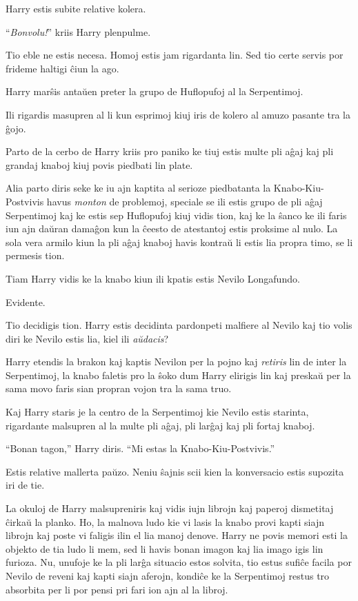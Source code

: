 Harry estis subite relative kolera.

``\emph{Bonvolu!}'' kriis Harry plenpulme.

Tio eble ne estis necesa. Homoj estis jam rigardanta lin. Sed tio
certe servis por frideme haltigi ĉiun la ago.

Harry marŝis antaŭen preter la grupo de Huflopufoj al la Serpentimoj.

Ili rigardis masupren al li kun esprimoj kiuj iris de kolero al amuzo
pasante tra la ĝojo.

Parto de la cerbo de Harry kriis pro paniko ke tiuj estis multe pli
aĝaj kaj pli grandaj knaboj kiuj povis piedbati lin plate.

Alia parto diris seke ke iu ajn kaptita al serioze piedbatanta la
Knabo-Kiu-Postvivis havus \emph{monton} de problemoj, speciale se ili
estis grupo de pli aĝaj Serpentimoj kaj ke estis sep Huflopufoj kiuj
vidis tion, kaj ke la ŝanco ke ili faris iun ajn daŭran damaĝon kun la
ĉeesto de atestantoj estis proksime al nulo. La sola vera armilo kiun
la pli aĝaj knaboj havis kontraŭ li estis lia propra timo, se li
permesis tion. 

Tiam Harry vidis ke la knabo kiun ili kpatis estis Nevilo Longafundo.

Evidente.

Tio decidigis tion. Harry estis decidinta pardonpeti malfiere al
Nevilo kaj tio volis diri ke Nevilo estis lia, kiel ili
\emph{aŭdacis}?

Harry etendis la brakon kaj kaptis Nevilon per la pojno kaj
\emph{retiris} lin de inter la Serpentimoj, la knabo faletis pro la
ŝoko dum Harry elirigis lin kaj preskaŭ per la sama movo faris
sian propran vojon tra la sama truo.

Kaj Harry staris je la centro de la Serpentimoj kie Nevilo estis
starinta, rigardante malsupren al la multe pli aĝaj, pli larĝaj kaj
pli fortaj knaboj.

``Bonan tagon,'' Harry diris. ``Mi estas la Knabo-Kiu-Postvivis.''

Estis relative mallerta paŭzo. Neniu ŝajnis scii kien la
konversacio estis supozita iri de tie.

La okuloj de Harry malsupreniris kaj vidis iujn librojn kaj paperoj
dismetitaj ĉirkaŭ la planko. Ho, la malnova ludo kie vi lasis la knabo
provi kapti siajn librojn kaj poste vi faligis ilin el lia manoj
denove. Harry ne povis memori esti la objekto de tia ludo li mem, sed
li havis bonan imagon kaj lia imago igis lin furioza. Nu, unufoje ke
la pli larĝa situacio estos solvita, tio estus sufiĉe facila por
Nevilo de reveni kaj kapti siajn aferojn, kondiĉe ke la Serpentimoj
restus tro absorbita per li por pensi pri fari ion ajn al la libroj.


